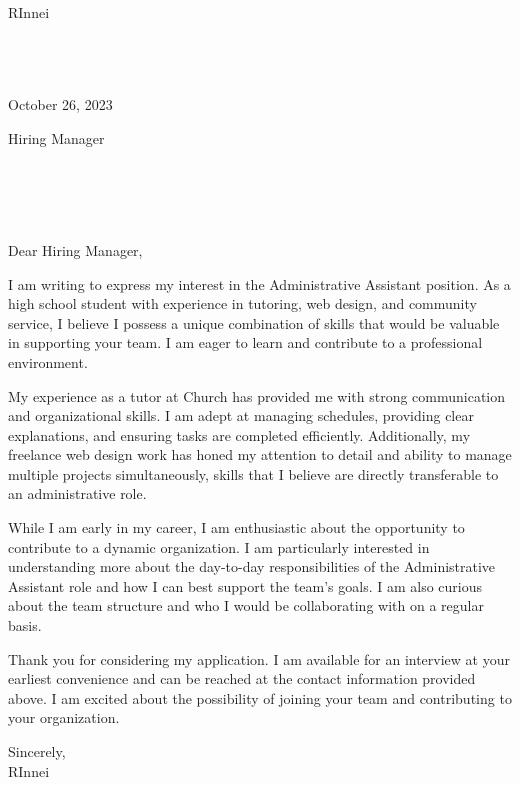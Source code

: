 \documentclass[letterpaper,11pt]{article}
\begin{document}
RInnei \\
[Address not provided] \\
[Phone number not provided] \\
[Email not provided] \\
\vspace{20pt}

October 26, 2023 \\
\vspace{20pt}

Hiring Manager \\
[Recipient Title not provided] \\
[Company Name not provided] \\
[Company Street Address not provided] \\
[Company City, State ZIP not provided] \\
\vspace{20pt}

Dear Hiring Manager, \\
\vspace{10pt}

I am writing to express my interest in the Administrative Assistant position. As a high school student with experience in tutoring, web design, and community service, I believe I possess a unique combination of skills that would be valuable in supporting your team. I am eager to learn and contribute to a professional environment.
\vspace{10pt}

My experience as a tutor at Church has provided me with strong communication and organizational skills. I am adept at managing schedules, providing clear explanations, and ensuring tasks are completed efficiently. Additionally, my freelance web design work has honed my attention to detail and ability to manage multiple projects simultaneously, skills that I believe are directly transferable to an administrative role.
\vspace{10pt}

While I am early in my career, I am enthusiastic about the opportunity to contribute to a dynamic organization. I am particularly interested in understanding more about the day-to-day responsibilities of the Administrative Assistant role and how I can best support the team's goals. I am also curious about the team structure and who I would be collaborating with on a regular basis.
\vspace{10pt}

Thank you for considering my application. I am available for an interview at your earliest convenience and can be reached at the contact information provided above. I am excited about the possibility of joining your team and contributing to your organization.
\vspace{20pt}

Sincerely, \\
\vspace{40pt} %
RInnei

\end{document}
